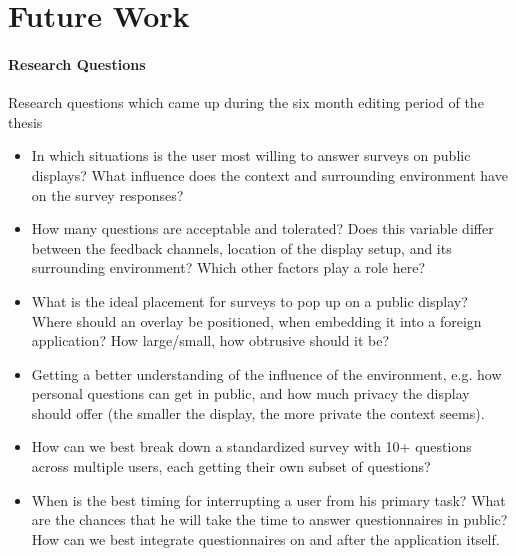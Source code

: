 \section{Future Work}
\label{chapter:future-work}

	

\paragraph{Research Questions}

	Research questions which came up during the six month editing period of the thesis

	\begin{itemize}
	\item In which situations is the user most willing to answer surveys on public displays? What influence does the context and surrounding environment have on the survey responses?
	\item How many questions are acceptable and tolerated? Does this variable differ between the feedback channels, location of the display setup, and its surrounding environment? Which other factors play a role here?
	\item What is the ideal placement for surveys to pop up on a public display? Where should an overlay be positioned, when embedding it into a foreign application? How large/small, how obtrusive should it be?
	\item Getting a better understanding of the influence of the environment, e.g. how personal questions can get in public, and how much privacy the display should offer (the smaller the display, the more private the context seems).
	\item How can we best break down a standardized survey with 10+ questions across multiple users, each getting their own subset of questions?
	\item When is the best timing for interrupting a user from his primary task? What are the chances that he will take the time to answer questionnaires in public? How can we best integrate questionnaires on and after the application itself.
	\end{itemize}




